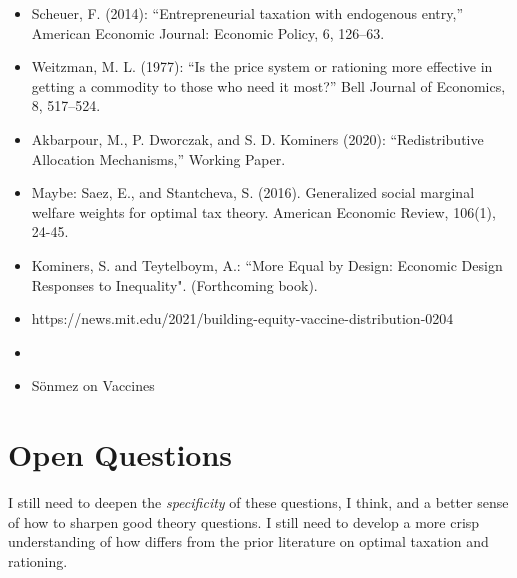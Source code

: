 \documentclass[JEL]{AEA}
\begin{document}
\begin{itemize}
    \item Scheuer, F. (2014): “Entrepreneurial taxation with endogenous entry,” American Economic Journal: Economic Policy, 6, 126–63.
    
    \item Weitzman, M. L. (1977): “Is the price system or rationing more effective in getting a commodity to those who need it most?” Bell Journal of Economics, 8, 517–524.
    
    \item Akbarpour, M., P. Dworczak, and S. D. Kominers (2020): “Redistributive Allocation Mechanisms,” Working Paper. %
    
    \item Maybe: Saez, E., and Stantcheva, S. (2016). Generalized social marginal welfare weights for optimal tax theory. American Economic Review, 106(1), 24-45.
    
    \item Kominers, S. and Teytelboym, A.: ``More Equal by Design: Economic Design Responses to Inequality". (Forthcoming book).
    
    \item https://news.mit.edu/2021/building-equity-vaccine-distribution-0204
    \item 
    \item Sönmez on Vaccines %

\end{itemize}

\section{Open Questions}

I still need to deepen the \emph{specificity} of these questions, I think, and a better sense of how to sharpen good theory questions. I still need to develop a more crisp understanding of how \cite{dworczak-2020} differs from the prior literature on optimal taxation and rationing.
\end{document}
